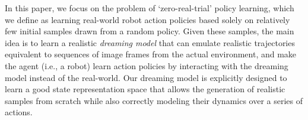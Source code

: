 \documentclass[letterpaper, 10 pt, conference]{ieeeconf}
\begin{document}
In this paper, we focus on the problem of `zero-real-trial' policy learning, which we define as learning real-world robot action policies based solely on relatively few initial samples drawn from a random policy.
Given these samples, the main idea is to learn a realistic \emph{dreaming model} that can emulate realistic trajectories equivalent to sequences of image frames from the actual environment, and make the agent (i.e., a robot) learn action policies by interacting with the dreaming model instead of the real-world. 
Our dreaming model is explicitly designed to learn a good state representation space that allows the generation of realistic samples from scratch while also correctly modeling their dynamics over a series of actions.
\end{document}
